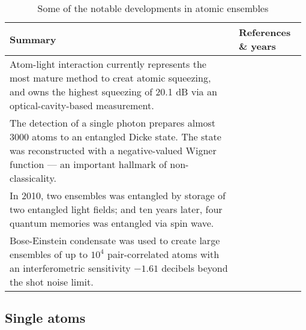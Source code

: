 \begin{table*}[!htbp]
	\begin{tabular}{|p{0.755\linewidth}|p{0.22\linewidth}|}
		\hline
		Summary & References \& years \\
		\hline \hline
		Atom-light interaction currently represents the most mature method to creat atomic squeezing, and owns the highest squeezing of 20.1 dB via an optical-cavity-based measurement. & \cite{bib:hosten2016measurement} \\
		\hline
		The detection of a single photon prepares almost 3000 atoms to an entangled Dicke state. The state was reconstructed with a negative-valued Wigner function --- an important hallmark of non-classicality. &  \cite{bib:mcconnell2015entanglement} \\
		\hline
		In 2010, two ensembles was entangled by storage of two entangled light fields; and ten years later, four quantum memories was entangled via spin wave. & \cite{bib:lukin2000entanglement, bib:choi2010entanglement} \\
		\hline
		Bose-Einstein condensate was used to create large ensembles of up to ${10^4}$ pair-correlated atoms with an interferometric sensitivity $-1.61$ decibels beyond the shot noise limit. & \cite{bib:lucke2011twin} \\
		\hline
	\end{tabular}
	\captionspacetab \caption{Some of the notable developments in atomic ensembles} \label{tab:atomic_ensembles}
\end{table*}

%
%

\subsection{Single atoms} 

